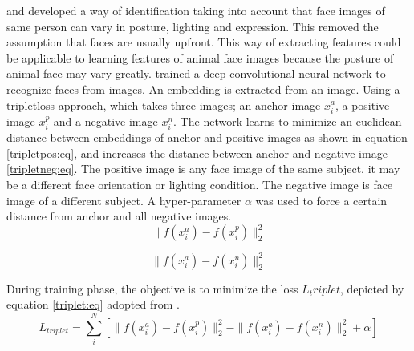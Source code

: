  \citeauthor{schroff2015facenet} \citeyear{schroff2015facenet} \cite{schroff2015facenet}  and \citeauthor{parkhi2015deep} \citeyear{parkhi2015deep} \cite{parkhi2015deep} developed a way of identification taking into account that face images of same person can vary in posture, lighting and expression. This removed the assumption that faces are usually upfront. This way of extracting features could be applicable to learning  features of animal face images because the posture of animal face may vary greatly. \citeauthor{schroff2015facenet} \citeyear{schroff2015facenet} \cite{schroff2015facenet} trained a deep convolutional neural network to recognize faces from images. An embedding is extracted from an image. Using a tripletloss approach, which takes three images; an anchor image $x_{i}^a$, a positive image $x_{i}^p$ and a negative image $x_{i}^n$. The network learns to minimize an euclidean distance between embeddings of anchor and positive images as shown in equation \ref{tripletpos:eq}, and increases the distance between anchor and negative image \ref{tripletneg:eq}. The positive image is any face image of the same subject, it may be a different face orientation or lighting condition. The negative image is face image of a different subject. A hyper-parameter $\alpha$ was used to force a certain distance from anchor and all negative images. 
 \begin{equation}\label{tripletpos:eq}
     \parallel f(x_{i}^a)-f(x_{i}^p)\parallel^2_2
 \end{equation}
 
 \begin{equation}\label{tripletneg:eq}
     \parallel f(x_{i}^a)-f(x_{i}^n)\parallel^2_2
 \end{equation}
 
 During training phase, the objective is to minimize the loss $L_triplet$, depicted by equation \ref{triplet:eq} adopted from \cite{schroff2015facenet}.     
 \begin{equation}\label{triplet:eq}
     L_{triplet} = \sum_{i}^N[\parallel f(x_{i}^a)-f(x_{i}^p)\parallel_{2}^2-\parallel f(x_{i}^a)-f(x_{i}^n)\parallel^2_2+\alpha] 
 \end{equation}
 
